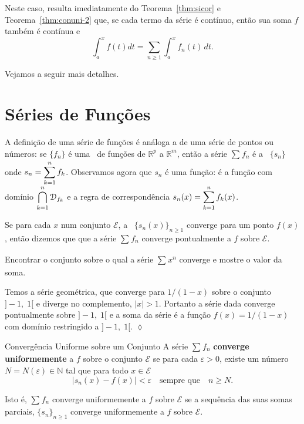 Neste caso, resulta imediatamente do Teorema~\ref{thm:sicor} e
Teorema~\ref{thm:conuni-2} que, se cada termo da série é contínuo,
então sua soma $f$ também é contínua e
\begin{equation}\label{conuni-4}
\int^x_a f(t) dt =\sum_{n\geq 1}\int_a^xf_n(t)\,dt.
\end{equation}

Vejamos a seguir mais detalhes.

\section{Séries de Funções}
A definição de uma série de funções é análoga a de uma série de
pontos ou números: se $\{f_n\}$ é uma \seq\ de funções de
$\mathbb{R}^p$ a $\mathbb{R}^m$, então a série $\sum_{}f_{n}$ é a \seq\ $\{s_n\}$ onde 
$\displaystyle{s_n=\sum_{k= 1}^nf_k}$.
Observamos agora que $s_n$ é uma função: é a função com domínio
$\displaystyle{\bigcap_{k=1}^{n} \mathcal{D}_{f_k}}$ e a regra de
correspondência $\displaystyle{s_n(x)=\sum_{k=1}^nf_k(x)}$.

Se para cada $x$ num conjunto $\mathcal{E}$, a \seq\
$\{s_n(x)\}_{n\ge 1}$ converge para um ponto $f(x)$, então dizemos
que que a série $\sum_{}f_{n}$ converge pontualmente a
$f$ sobre $\mathcal{E}$.

\begin{exer}
Encontrar o conjunto sobre o qual a série $\sum_{}x^{n}$ converge e mostre o valor da soma.
\end{exer}

\solo Temos a série geométrica, que converge para $1/(1-x)$ sobre
o conjunto $]-1,\; 1[$ e diverge no complemento, $|x|>1$. Portanto a
série dada converge pontualmente sobre $]-1,\; 1[$ e a soma da série
é a função $f(x)=1/(1-x)$ com domínio restringido a $]-1,\; 1[$.
\hfill \(\lozenge\)

\begin{defic}{Convergência Uniforme sobre um Conjunto}{}
A série $\sum_{}f_{n}$ \textbf{converge
uniformemente} a $f$ sobre o conjunto $\mathcal{E}$ se para cada
$\varepsilon>0$, existe um número $N=N(\varepsilon)\in \mathbb{N}$ tal que para todo $x\in
\mathcal{E}$
\begin{equation*}
    |s_n(x)-f(x)|<\varepsilon\quad \text{sempre que}\quad n \geq N.
\end{equation*}
\end{defic}

Isto é, $\sum_{}f_{n}$ converge uniformemente a $f$
sobre $\mathcal{E}$ se a sequência das suas somas parciais,
$\{s_n\}_{n\ge 1}$ converge uniformemente a $f$ sobre
$\mathcal{E}$.

